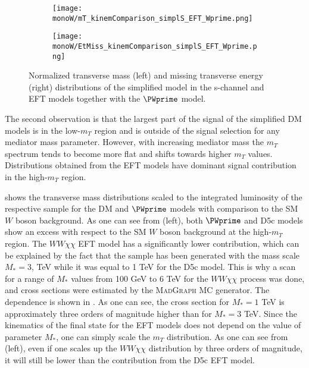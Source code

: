 \begin{figure}[]
\begin{subfigure}{.5\textwidth}
  \centering
  \texttt{[image: monoW/mT\_kinemComparison\_simplS\_EFT\_Wprime.png]}
\end{subfigure}%
\begin{subfigure}{.5\textwidth}
  \centering
  \texttt{[image: monoW/EtMiss\_kinemComparison\_simplS\_EFT\_Wprime.png]}
\end{subfigure}
\caption{Normalized transverse mass (left) and missing transverse energy (right) distributions of the simplified model in the s-channel and EFT models together with the $\PWprime$ model.}
  \label{fig:kinematicsSChannel}
\end{figure}

The second observation is that the largest part of the signal of the simplified DM models 
is in the low-$m_{T}$ region and is outside of the signal selection for any mediator mass parameter.
However, with increasing mediator mass the $m_{T}$ spectrum tends to become 
more flat and shifts towards higher $m_{T}$ values.
Distributions obtained from the EFT models have dominant signal contribution in the high-$m_T$ region.

 shows the transverse mass distributions
scaled to the integrated luminosity of the respective sample for the DM and $\PWprime$ models with comparison to the SM $W$ boson background.
As one can see from  (left), both $\PWprime$ and 
D5c models show an excess with respect to the SM $W$ boson background at the high-$m_T$ region. The $WW\chi\chi$ EFT model has a significantly lower contribution, which can be explained by the fact that the sample has been generated with the mass scale $M_{*} = 3$, TeV while it was equal to 1 TeV for the D5c model. 
This is why a scan for a range of $M_{*}$ values from 100 GeV to 6 TeV for the $WW\chi\chi$ process was done, and cross sections were estimated by the M{\scshape ad}G{\scshape raph} MC generator.
The dependence is shown in .
As one can see, the cross section for $M_{*} = 1$ TeV is approximately three orders of magnitude higher than for $M_{*} = 3$ TeV.
Since the kinematics of the final state for the EFT models does not depend on the value of parameter $M_{*}$, one can simply scale the $m_T$ distribution.
As one can see from  (left), even if one scales up the $WW\chi\chi$ distribution by three orders of magnitude, it will still be lower than the contribution from the D5c EFT model.

